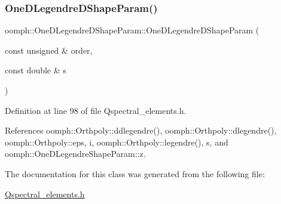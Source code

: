 \subsubsection{\texorpdfstring{One\+D\+Legendre\+D\+Shape\+Param()}{OneDLegendreDShapeParam()}}
{\footnotesize\ttfamily oomph\+::\+One\+D\+Legendre\+D\+Shape\+Param\+::\+One\+D\+Legendre\+D\+Shape\+Param (\begin{DoxyParamCaption}\item[{const unsigned \&}]{order,  }\item[{const double \&}]{s }\end{DoxyParamCaption})\hspace{0.3cm}{\ttfamily [inline]}}



Definition at line 98 of file Qspectral\+\_\+elements.\+h.



References oomph\+::\+Orthpoly\+::ddlegendre(), oomph\+::\+Orthpoly\+::dlegendre(), oomph\+::\+Orthpoly\+::eps, i, oomph\+::\+Orthpoly\+::legendre(), s, and oomph\+::\+One\+D\+Legendre\+Shape\+Param\+::z.



The documentation for this class was generated from the following file\+:\begin{DoxyCompactItemize}
\item 
\hyperlink{Qspectral__elements_8h}{Qspectral\+\_\+elements.\+h}\end{DoxyCompactItemize}
